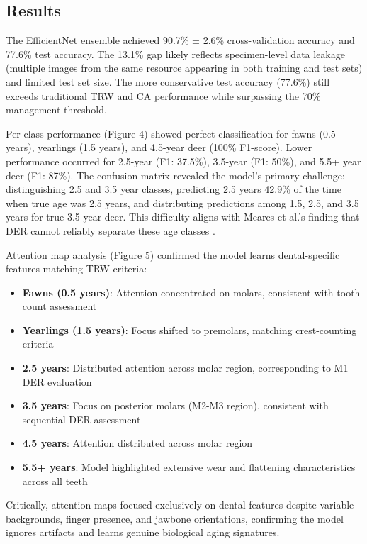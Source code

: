 \documentclass[11pt]{article}
\begin{document}
\subsection{Results}

The EfficientNet ensemble achieved 90.7\% ± 2.6\% cross-validation accuracy and 77.6\% test accuracy. The 13.1\% gap likely reflects specimen-level data leakage (multiple images from the same resource appearing in both training and test sets) and limited test set size. The more conservative test accuracy (77.6\%) still exceeds traditional TRW and CA performance while surpassing the 70\% management threshold.

Per-class performance (Figure 4) showed perfect classification for fawns (0.5 years), yearlings (1.5 years), and 4.5-year deer (100\% F1-score). Lower performance occurred for 2.5-year (F1: 37.5\%), 3.5-year (F1: 50\%), and 5.5+ year deer (F1: 87\%). The confusion matrix revealed the model's primary challenge: distinguishing 2.5 and 3.5 year classes, predicting 2.5 years 42.9\% of the time when true age was 2.5 years, and distributing predictions among 1.5, 2.5, and 3.5 years for true 3.5-year deer. This difficulty aligns with Meares et al.'s finding that DER cannot reliably separate these age classes \cite{meares2006quantitative}.

Attention map analysis (Figure 5) confirmed the model learns dental-specific features matching TRW criteria:
\begin{itemize}
    \item \textbf{Fawns (0.5 years)}: Attention concentrated on molars, consistent with tooth count assessment
    \item \textbf{Yearlings (1.5 years)}: Focus shifted to premolars, matching crest-counting criteria  
    \item \textbf{2.5 years}: Distributed attention across molar region, corresponding to M1 DER evaluation
    \item \textbf{3.5 years}: Focus on posterior molars (M2-M3 region), consistent with sequential DER assessment
    \item \textbf{4.5 years}: Attention distributed across molar region
    \item \textbf{5.5+ years}: Model highlighted extensive wear and flattening characteristics across all teeth
\end{itemize}

Critically, attention maps focused exclusively on dental features despite variable backgrounds, finger presence, and jawbone orientations, confirming the model ignores artifacts and learns genuine biological aging signatures.
\end{document}

